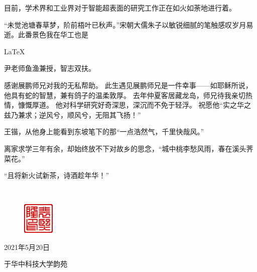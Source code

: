 \documentclass[supercite]{HustGraduPaper}
\begin{document}
目前，学术界和工业界对于智能超表面的研究工作正在如火如荼地进行着。

\begin{thankpage}
	
	“未觉池塘春草梦，阶前梧叶已秋声。”宋朝大儒朱子以敏锐细腻的笔触感叹岁月易逝。此番景色我在华工也是

	\LaTeX
	
	尹老师鱼渔兼授，智志双扶。

	感谢展鹏师兄对我的无私帮助。
	此生遇见展鹏师兄是一件幸事——如耶稣所说，他具有蛇的智慧，兼有鸽子的温柔敦厚。
	去年仲夏客居藏龙岛，师兄待我亲切热情，慷慨厚道。
	他对科学研究好奇深思，深沉而不免于轻浮。
	祝愿他“实之华之兹乃兼求；逆风兮，顺风兮，无阻其飞扬！”


	王锴，从他身上能看到东坡笔下的那“一点浩然气，千里快哉风。”
	
	离家求学三年有余，却始终放不下对故乡的思念，“城中桃李愁风雨，春在溪头荠菜花。”

	“且将新火试新茶，诗酒趁年华！”


	\begin{center}
		\textcolor{white}{\itshape “满纸荒唐言，一把辛酸泪。都云作者痴，谁解其中味？”}
	\end{center}
	
	\begin{figure}[htb]
		\raggedleft
		\includegraphics[width=15mm]{Figures/Seal-pxl.pdf}
	\end{figure}

	\begin{flushright}
		2021年5月20日

		于华中科技大学韵苑
	\end{flushright}
	
\end{thankpage}


\end{document}
